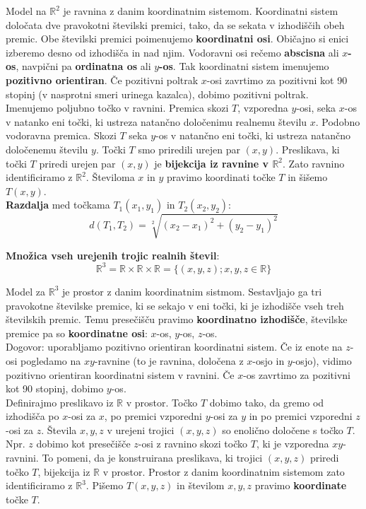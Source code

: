 \documentclass[a4paper,12pt]{article}
\begin{document}
Model na $\mathbb{R}^2$ je ravnina z danim koordinatnim sistemom. Koordinatni sistem določata dve pravokotni številski premici, tako, da se sekata v izhodiščih obeh premic. Obe številski premici poimenujemo \textbf{koordinatni osi}. Običajno si enici izberemo desno od izhodišča in nad njim. Vodoravni osi rečemo \textbf{abscisna} ali \textbf{$x$-os}, navpični pa \textbf{ordinatna os} ali \textbf{$y$-os}. Tak koordinatni sistem imenujemo \textbf{pozitivno orientiran}. Če pozitivni poltrak $x$-osi zavrtimo za pozitivni kot 90 stopinj (v nasprotni smeri urinega kazalca), dobimo pozitivni poltrak. \\

Imenujemo poljubno točko v ravnini. Premica skozi $T$, vzporedna $y$-osi, seka $x$-os v natanko eni točki, ki ustreza natančno določenimu realnemu številu $x$. Podobno vodoravna premica. Skozi $T$ seka $y$-os v natančno eni točki, ki ustreza natančno določenemu številu $y$. Točki $T$ smo priredili urejen par $(x,y)$. Preslikava, ki točki $T$ priredi urejen par $(x,y)$ je \textbf{bijekcija iz ravnine v $\mathbb{R}^2$}. Zato ravnino identificiramo z $\mathbb{R}^2$. Številoma $x$ in $y$ pravimo koordinati točke $T$ in šišemo $T(x,y)$. \\

\textbf{Razdalja} med točkama $T_1(x_1,y_1)$ in $T_2(x_2,y_2)$: $$d(T_1,T_2) = \sqrt[2]{(x_2 - x_1)^2 + (y_2 - y_1)^2}$$ 

\textbf{Množica vseh urejenih trojic realnih števil}: $$\mathbb{R}^3 = \mathbb{R} \times \mathbb{R} \times \mathbb{R} = \{(x,y,z) ; x,y,z \in \mathbb{R} \}$$

Model za $\mathbb{R}^3$ je prostor z danim koordinatnim sistmom. Sestavljajo ga tri pravokotne številske premice, ki se sekajo v eni točki, ki je izhodišče vseh treh številskih premic. Temu presečišču pravimo \textbf{koordinatno izhodišče}, številske premice pa so \textbf{koordinatne osi}: $x$-os, $y$-os, $z$-os. \\

Dogovor: uporabljamo pozitivno orientiran koordinatni sistem. Če iz enote na $z$-osi pogledamo na $xy$-ravnine (to je ravnina, določena z $x$-osjo in $y$-osjo), vidimo pozitivno orientiran koordinatni sistem v ravnini. Če $x$-os zavrtimo za pozitivni kot 90 stopinj, dobimo $y$-os. \\

Definirajmo preslikavo iz $\mathbb{R}$ v prostor. Točko $T$ dobimo tako, da gremo od izhodišča po $x$-osi za $x$, po premici vzporedni $y$-osi za $y$ in po premici vzporedni $z$-osi za $z$. Števila $x,y,z$ v urejeni trojici $(x,y,z)$ so enolično določene s točko $T$. Npr. $z$ dobimo kot presečišče $z$-osi z ravnino skozi točko $T$, ki je vzporedna $xy$-ravnini. To pomeni, da je konstruirana preslikava, ki trojici $(x,y,z)$ priredi točko $T$, bijekcija iz $\mathbb{R}$ v prostor. Prostor z danim \linebreak koordinatnim sistemom zato identificiramo z $\mathbb{R}^3$. Pišemo $T(x,y,z)$ in številom $x,y,z$ pravimo \textbf{koordinate} točke $T$. \\
\end{document}
